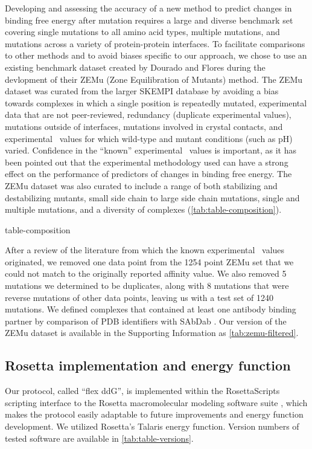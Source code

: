 Developing and assessing the accuracy of a new method to predict changes in binding free energy after mutation requires a large and diverse benchmark set covering single mutations to all amino acid types, multiple mutations, and mutations across a variety of protein-protein interfaces.
To facilitate comparisons to other methods and to avoid biases specific to our approach, we chose to use an existing benchmark dataset created by Dourado and Flores\cite{dourado_multiscale_2014} during the devlopment of their ZEMu (Zone Equilibration of Mutants) method.
The ZEMu dataset was curated from the larger SKEMPI database\cite{moal_skempi:_2012} by avoiding a bias towards complexes in which a single position is repeatedly mutated, experimental data that are not peer-reviewed, redundancy (duplicate experimental values), mutations outside of interfaces, mutations involved in crystal contacts, and experimental \ddg\ values for which wild-type and mutant conditions (such as pH) varied.
Confidence in the ``known'' experimental \ddg\ values is important, as it has been pointed out that the experimental methodology used can have a strong effect on the performance of predictors of changes in binding free energy\cite{geng_exploring_2016}.
The ZEMu dataset was also curated to include a range of both stabilizing and destabilizing mutants, small side chain to large side chain mutations, single and multiple mutations, and a diversity of complexes (\cref{tab:table-composition}).

{table-composition}

After a review of the literature from which the known experimental \ddg\ values originated, we removed one data point from the 1254 point ZEMu set that we could not match to the originally reported affinity value. We also removed 5 mutations we determined to be duplicates, along with 8 mutations that were reverse mutations of other data points, leaving us with a test set of 1240 mutations.
We defined complexes that contained at least one antibody binding partner by comparison of PDB identifiers with SAbDab \cite{dunbar_sabdab:_2014}.
Our version of the ZEMu dataset is available in the Supporting Information as \cref{tab:zemu-filtered}.

\subsection{Rosetta implementation and energy function}

Our protocol, called ``flex ddG'', is implemented within the RosettaScripts scripting interface to the Rosetta macromolecular modeling software suite \cite{fleishman_rosettascripts:_2011}, which makes the protocol easily adaptable to future improvements and energy function development. We utilized Rosetta's Talaris \cite{leaver-fay_chapter_2013,song_structure-guided_2011,shapovalov_smoothed_2011} energy function.
Version numbers of tested software are available in \cref{tab:table-versions}.


